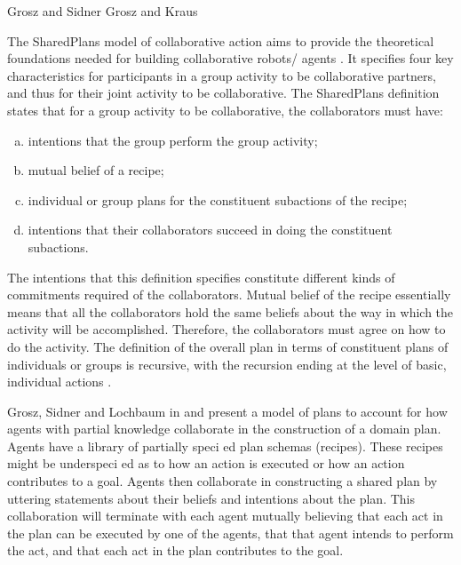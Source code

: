 \documentclass[11pt]{article}
\begin{document}
Grosz and Sidner \cite{grosz:plans-discourse}
Grosz and Kraus \cite{grosz:collaboration}

The SharedPlans model of collaborative action \cite{grosz:planning-acting}
\cite{grosz:collaboration} \cite{grosz:plans-discourse} aims to provide the
theoretical foundations needed for building collaborative robots/ agents
\cite{grosz:collaborative-systems}. It specifies four key characteristics for
participants in a group activity to be collaborative partners, and thus for
their joint activity to be collaborative. The SharedPlans definition states that
for a group activity to be collaborative, the collaborators must have:

\begin{enumerate}[a)]
  \item intentions that the group perform the group activity;
  \item mutual belief of a recipe;
  \item individual or group plans for the constituent subactions of the recipe;
  \item intentions that their collaborators succeed in doing the constituent
  subactions.
\end{enumerate}
 
The intentions that this definition specifies constitute different kinds of
commitments required of the collaborators. Mutual belief of the recipe
essentially means that all the collaborators hold the same beliefs about the way
in which the activity will be accomplished. Therefore, the collaborators must
agree on how to do the activity. The definition of the overall plan in terms of
constituent plans of individuals or groups is recursive, with the recursion
ending at the level of basic, individual actions \cite{grosz:mice-menus}.

Grosz, Sidner and Lochbaum in \cite{grosz:plans-discourse} and
\cite{lochbaum:plan-models} present a model of plans to account for how agents
with partial knowledge collaborate in the construction of a domain plan. Agents
have a library of partially speci ed plan schemas (recipes). These recipes might
be underspeci ed as to how an action is executed or how an action contributes to
a goal. Agents then collaborate in constructing a shared plan by uttering
statements about their beliefs and intentions about the plan. This collaboration
will terminate with each agent mutually believing that each act in the plan can
be executed by one of the agents, that that agent intends to perform the act,
and that each act in the plan contributes to the goal.
\end{document}
